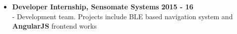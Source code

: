\documentclass[a4paper,10pt]{article}
\newcommand{\when}[1]{\hfill \textbf{#1}}
\newenvironment{noSepItemize}
{ \begin{itemize}
    \setlength{\itemsep}{1pt}
    \setlength{\parskip}{0pt}
    \setlength{\parsep}{0pt}     }
{ \end{itemize}                  }
\begin{document}
\begin{noSepItemize}
	\\ \indent \indent - Implemented auto tracking of work items via Trello API for easier work overview.
	\\ \indent \indent - Automated logging and mailing of work processes done during the week for easier accessibility.
	\item \noindent \textbf{Developer Internship, Sensomate Systems} \when{2015 - 16}\\
	\indent - Development team. Projects include BLE based navigation system and \textbf{AngularJS} frontend works
\end{noSepItemize}
\end{document}
